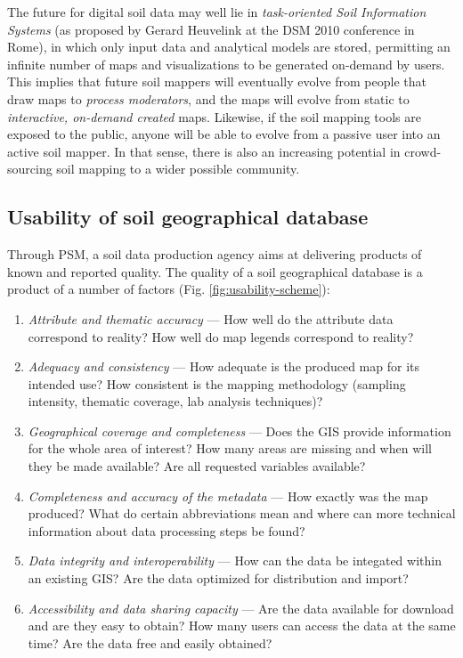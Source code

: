 \documentclass[11pt]{krantz}
\theoremstyle{definition}
\theoremstyle{definition}
\theoremstyle{definition}
\theoremstyle{remark}
\begin{document}
The future for digital soil data may well lie in \emph{task-oriented
Soil Information Systems} (as proposed by Gerard Heuvelink at the DSM
2010 conference in Rome), in which only input data and analytical models
are stored, permitting an infinite number of maps and visualizations to
be generated on-demand by users. This implies that future soil mappers
will eventually evolve from people that draw maps to \emph{process
moderators}, and the maps will evolve from static to \emph{interactive,
on-demand created} maps. Likewise, if the soil mapping tools are exposed
to the public, anyone will be able to evolve from a passive user into an
active soil mapper. In that sense, there is also an increasing potential
in crowd-sourcing soil mapping to a wider possible community.

\hypertarget{usability-of-soil-geographical-database}{%
\subsection{Usability of soil geographical
database}\label{usability-of-soil-geographical-database}}

Through PSM, a soil data production agency aims at delivering products
of known and reported quality. The quality of a soil geographical
database is a product of a number of factors (Fig.
\ref{fig:usability-scheme}):

\begin{enumerate}
\def\labelenumi{\arabic{enumi}.}
\item
  \emph{Attribute and thematic accuracy} --- How well do the attribute
  data correspond to reality? How well do map legends correspond to
  reality?
\item
  \emph{Adequacy and consistency} --- How adequate is the produced map
  for its intended use? How consistent is the mapping methodology
  (sampling intensity, thematic coverage, lab analysis techniques)?
\item
  \emph{Geographical coverage and completeness} --- Does the GIS provide
  information for the whole area of interest? How many areas are missing
  and when will they be made available? Are all requested variables
  available?
\item
  \emph{Completeness and accuracy of the metadata} --- How exactly was
  the map produced? What do certain abbreviations mean and where can
  more technical information about data processing steps be found?
\item
  \emph{Data integrity and interoperability} --- How can the data be
  integated within an existing GIS? Are the data optimized for
  distribution and import?
\item
  \emph{Accessibility and data sharing capacity} --- Are the data
  available for download and are they easy to obtain? How many users can
  access the data at the same time? Are the data free and easily
  obtained?
\end{enumerate}
\end{document}
